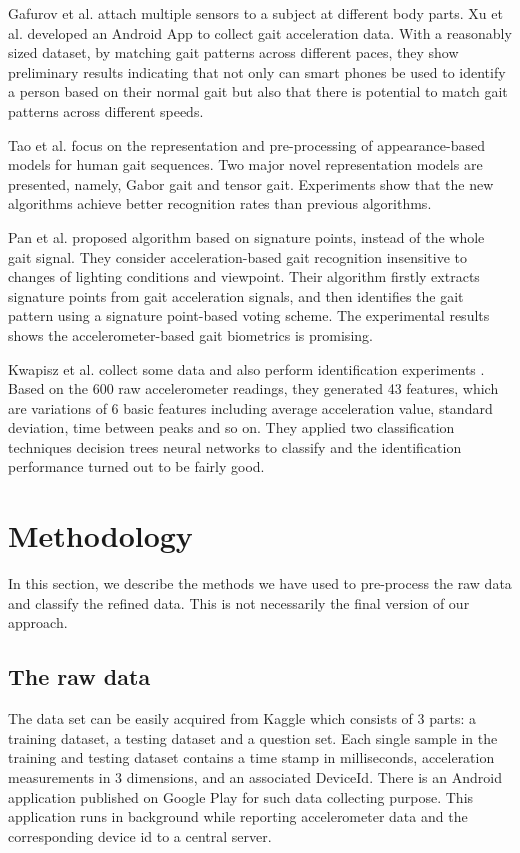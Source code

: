 \documentclass{article} %
\begin{document}
Gafurov et al. \cite{Gafurov:AIAT2007} attach multiple sensors to a subject at different body parts. Xu et al. \cite{Xu:ICB2012} developed an Android App to collect gait acceleration data. With a reasonably sized dataset, by matching gait patterns across different paces, they show preliminary results indicating that not only can smart phones be used to identify a person based on their normal gait but also that there is potential to match gait patterns across different speeds.

Tao et al.\cite{Tao:ToPAMI2007} focus on the representation and pre-processing of appearance-based models for human gait sequences. Two major novel representation models are presented, namely, Gabor gait and tensor gait. Experiments show that the new algorithms achieve better recognition rates than previous algorithms.

Pan et al. \cite{Pan:EL2009} proposed algorithm based on signature points, instead of the whole gait signal. They consider acceleration-based gait recognition insensitive to changes of lighting conditions and viewpoint. Their algorithm firstly extracts signature points from gait acceleration signals, and then identifies the gait pattern using a signature point-based voting scheme. The experimental results shows the accelerometer-based gait biometrics is promising. 

Kwapisz et al.\cite{Kwapisz:BTAS2009} collect some data and also perform identification experiments . Based on the 600 raw accelerometer readings, they generated 43 features, which are variations of 6 basic features including average acceleration value, standard deviation, time between peaks and so on. They applied two classification techniques decision trees neural networks to classify and the identification performance turned out to be fairly good.



\section{Methodology}
In this section, we describe the methods we have used to pre-process the raw data and classify the refined data. This is not necessarily the final version of our approach. 

\subsection{The raw data}
The data set can be easily acquired from Kaggle which consists of 3 parts: a training dataset, a testing dataset and a question set. Each single sample in the training and testing dataset contains a time stamp in milliseconds, acceleration measurements in 3 dimensions, and an associated DeviceId.  There is an Android application published on Google Play for such data collecting purpose. This application runs in background while reporting accelerometer data and the corresponding device id to a central server. 
\end{document}
